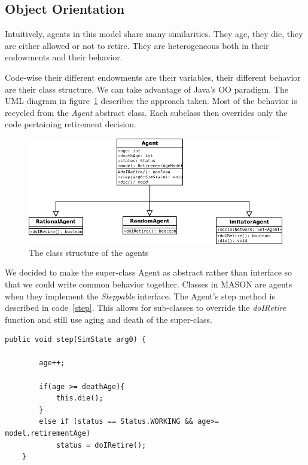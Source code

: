 \documentclass[runningheads,a4paper]{article}
\begin{document}
\subsection{Object Orientation}

Intuitively, agents in this model share many similarities.
They age, they die, they are either allowed or not to retire.
They are heterogeneous both in their endowments and their behavior.

Code-wise their different endowments are their variables, their different behavior are their class structure.
We can take advantage of Java's OO paradigm.
The UML diagram in figure~\ref{UML} describes the approach taken.
Most of the behavior is recycled from the \textit{Agent} abstract class.
Each subclass then overrides only the code pertaining retirement decision.

\begin{figure}
 \begin{center}
  \includegraphics[scale=.45]{figs/UML.png}
\caption{The class structure of the agents}
\label{UML}
 \end{center}
\end{figure}

We decided to make the super-class Agent as abstract rather than interface so that we could write common behavior together.
Classes in MASON are agents when they implement the \textit{Steppable} interface.
The Agent's step method is described in code~\ref{step}.
This allows for sub-classes to override the \textit{doIRetire} function and still use aging and death of the super-class.
{
\linespread{1}
\begin{lstlisting}[float,caption= {Agent's step class}, label={step}]
public void step(SimState arg0) {
		
		age++;

		if(age >= deathAge){
			this.die();
		}
		else if (status == Status.WORKING && age>= model.retirementAge)	
			status = doIRetire();	
	}

\end{lstlisting}
}
\end{document}
